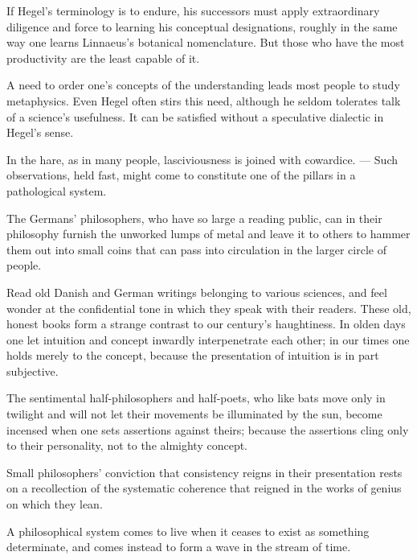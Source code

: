 \documentclass[12pt,a4paper]{article}
\newcommand{\opage}[1]{\marginnote{\footnotesize\textit{[#1]}}}
\newcommand{\aphsep}{\par\smallskip\centerline{\textasteriskcentered}\smallskip}
\begin{document}
If Hegel's terminology is to endure, his successors must apply extraordinary
diligence and force to learning his conceptual designations, roughly in the same
way one learns Linnaeus's botanical nomenclature. But those who have the most
productivity are the least capable of it.

\aphsep

A need to order one's concepts of the understanding leads most people to study
metaphysics. Even Hegel often stirs this need, although he seldom tolerates talk
of a science's usefulness. It can be satisfied without a speculative dialectic in
Hegel's sense.

\aphsep

In the hare, as in many people, lasciviousness is joined with cowardice. ---
Such observations, held fast, might come to constitute one of the pillars in a
pathological system.

\aphsep

The Germans' philosophers, who have so large a reading public, can in their
philosophy furnish the unworked lumps of metal and leave it to others to hammer
them out into small coins that can pass into circulation in the larger circle of
people.

\aphsep

Read old Danish and German writings belonging to various sciences, and feel
wonder at the confidential tone in which they speak with their readers. These
old, honest books form a strange contrast to our century's haughtiness. In olden
days one let intuition and concept \opage{22}inwardly interpenetrate each other;
in our times one holds merely to the concept, because the presentation of
intuition is in part subjective.

\aphsep

The sentimental half-philosophers and half-poets, who like bats move only in
twilight and will not let their movements be illuminated by the sun, become
incensed when one sets assertions against theirs; because the assertions cling
only to their personality, not to the almighty concept.

\aphsep

Small philosophers' conviction that consistency reigns in their presentation
rests on a recollection of the systematic coherence that reigned in the works of
genius on which they lean.

\aphsep

A philosophical system comes to live when it ceases to exist as something
determinate, and comes instead to form a wave in the stream of time.
\end{document}
